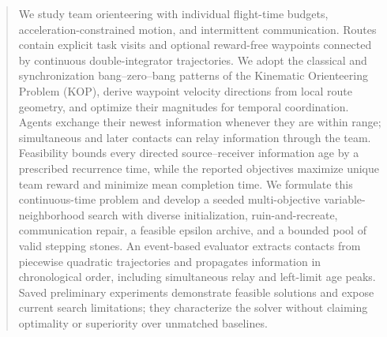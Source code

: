 \begin{abstract}
We study team orienteering with individual flight-time budgets, acceleration-constrained motion, and intermittent communication. Routes contain explicit task visits and optional reward-free waypoints connected by continuous double-integrator trajectories. We adopt the classical and synchronization bang--zero--bang patterns of the Kinematic Orienteering Problem (KOP), derive waypoint velocity directions from local route geometry, and optimize their magnitudes for temporal coordination. Agents exchange their newest information whenever they are within range; simultaneous and later contacts can relay information through the team. Feasibility bounds every directed source--receiver information age by a prescribed recurrence time, while the reported objectives maximize unique team reward and minimize mean completion time. We formulate this continuous-time problem and develop a seeded multi-objective variable-neighborhood search with diverse initialization, ruin-and-recreate, communication repair, a feasible epsilon archive, and a bounded pool of valid stepping stones. An event-based evaluator extracts contacts from piecewise quadratic trajectories and propagates information in chronological order, including simultaneous relay and left-limit age peaks. Saved preliminary experiments demonstrate feasible solutions and expose current search limitations; they characterize the solver without claiming optimality or superiority over unmatched baselines.
\end{abstract}
